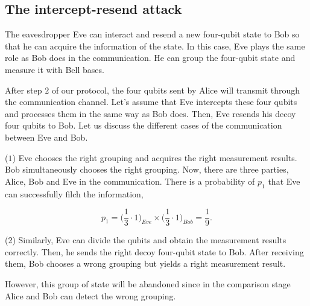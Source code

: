 \documentclass[a4paper,11pt]{article}
\begin{document}
\subsection{The intercept-resend attack}
The eavesdropper Eve can interact and resend a new four-qubit state to Bob so that he can acquire the information of the state. In this case, Eve plays the same role as Bob does in the communication. He can group the four-qubit state and measure it with Bell bases.

After step $2$ of our protocol, the four qubits sent by Alice will transmit through the communication channel. Let’s assume that Eve intercepts these four qubits and processes
them in the same way as Bob does. Then, Eve resends his decoy four qubits to Bob. Let us discuss the different cases of the communication between Eve and Bob.

($1$) Eve chooses the right grouping and acquires the right measurement results. Bob simultaneously chooses the right grouping. Now, there are three parties, Alice, Bob and Eve
in the communication. There is a probability of $p_1$ that Eve can successfully filch the information,

\begin{equation*}
 p_1 = \Big(\dfrac{1}{3} \cdot 1 \Big)_{Eve} \times  \Big(\dfrac{1}{3} \cdot 1 \Big)_{Bob} = \dfrac{1}{9}.
\end{equation*}

(2) Similarly, Eve can divide the qubits and obtain the measurement results correctly. Then, he sends the right decoy four-qubit state to Bob. After receiving them, Bob chooses a wrong grouping but yields a right measurement result.

However, this group of state will be abandoned since in the comparison stage Alice and Bob can detect the wrong grouping.
\end{document}
